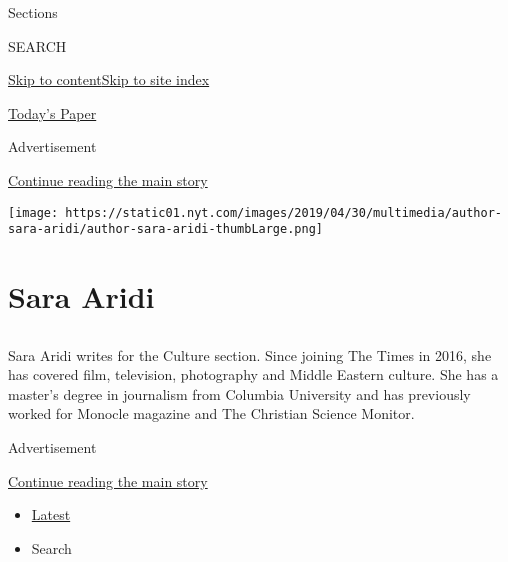 Sections

SEARCH

\protect\hyperlink{site-content}{Skip to
content}\protect\hyperlink{site-index}{Skip to site index}

\href{https://myaccount.nytimes.com/auth/login?response_type=cookie\&client_id=vi}{}

\href{https://www.nytimes.com/section/todayspaper}{Today's Paper}

Advertisement

\protect\hyperlink{after-top}{Continue reading the main story}

\texttt{[image: https://static01.nyt.com/images/2019/04/30/multimedia/author-sara-aridi/author-sara-aridi-thumbLarge.png]}

\hypertarget{sara-aridi}{%
\section{Sara Aridi}\label{sara-aridi}}

\hypertarget{section}{%
\subsection{}\label{section}}

Sara Aridi writes for the Culture section. Since joining The Times in
2016, she has covered film, television, photography and Middle Eastern
culture. She has a master's degree in journalism from Columbia
University and has previously worked for Monocle magazine and The
Christian Science Monitor.

Advertisement

\protect\hyperlink{after-mid1}{Continue reading the main story}

\begin{itemize}
\tightlist
\item
  \protect\hyperlink{stream-panel}{Latest}
\item
  Search
\end{itemize}

